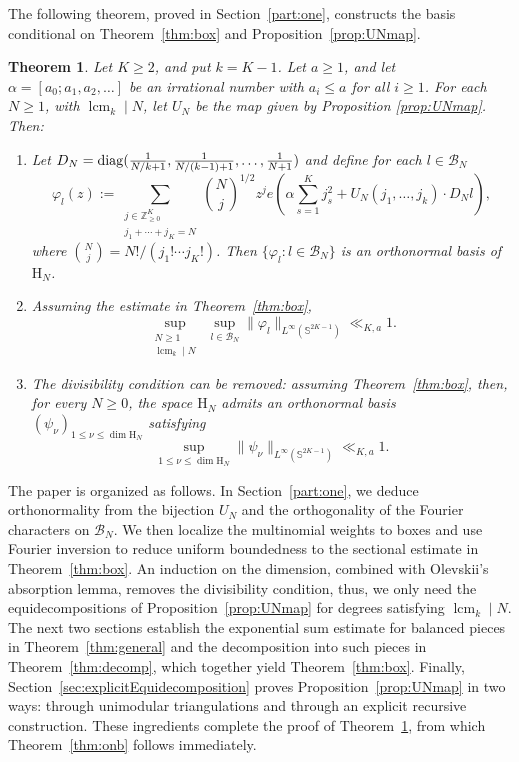 \documentclass[a4paper,reqno,12pt]{amsart}
\theoremstyle{plain}
\newtheorem{theorem}{Theorem}
\theoremstyle{plain}
\theoremstyle{remark}
\theoremstyle{plain}
\newcommand{\B}{\mathscr{B}}
\newcommand{\PolySpace}{\mathrm{H}}
\newcommand{\p}{\varphi}
\newcommand{\Sphere}{\mathbb{S}}
\newcommand{\lcmk}{\operatorname{lcm}_k}
\theoremstyle{plain}
\theoremstyle{plain}
\begin{document}
{The following theorem, proved in Section~\ref{part:one}, constructs the basis conditional on
Theorem~\ref{thm:box} and Proposition~\ref{prop:UNmap}.

\begin{theorem}\label{thm:onbexplicit}
Let $K\ge2${, and} put $k=K-1$. Let $a\ge1$, and let $\alpha = [a_0; a_1, a_2, \ldots]$ be an
irrational number with $a_i \leq a$ for all $i \geq 1$. 
For each $N\ge1$, with $\lcmk\mid N$, let $U_N$ be the map given by Proposition \ref{prop:UNmap}.
Then:
\begin{enumerate}
\item Let $D_N = {\rm diag}(\frac{1}{N/k+1}, \frac{1}{N/(k-1)+1},\ldots, \frac{1}{N+1})$ and define for each $l \in \B_N$
  \begin{equation}
  \p_{l}(z):=
  \sum_{\substack{j\in\mathbb Z_{\ge0}^K\\j_1+\cdots+j_K=N}}
  \binom Nj^{1/2}z^j
  e\left(\alpha\sum_{s=1}^Kj_s^2
  +U_N(j_1,\ldots,j_k)\cdot D_N l\right),
  \label{eq:originalBasis}
  \end{equation}
 where
  $\binom Nj=N!/(j_1!\cdots j_K!)$.
  Then $\{\p_{l}:l\in\B_N\}$ is an orthonormal basis
  of $\PolySpace_N${.}
\item Assuming the estimate in Theorem~\ref{thm:box},
  \[
  \sup_{\substack{N\ge1\\ \lcmk\mid N}}
  \ \sup_{l\in\B_N}
  \|\p_{l}\|_{L^\infty(\Sphere^{2K-1})}\ll_{K,a}1{.}
  \]
\item The divisibility condition can be
  removed: assuming Theorem~\ref{thm:box}, then, for every $N\ge0$, the space $\PolySpace_N$ admits an orthonormal basis
  $(\psi_\nu)_{1\leq \nu\le\dim\PolySpace_N}$ satisfying
  \[
    \sup_{1\leq \nu\le\dim\PolySpace_N}
    \|\psi_\nu\|_{L^\infty(\Sphere^{2K-1})}\ll_{K,a}1.
  \]
\end{enumerate}
\end{theorem} 

{The paper is organized as follows. In Section~\ref{part:one}, we deduce orthonormality from the bijection $U_N$ and the orthogonality of the Fourier characters on $\B_N$. We then localize the multinomial weights to boxes and use Fourier inversion to reduce uniform boundedness to the sectional estimate in Theorem~\ref{thm:box}. An induction on the dimension, combined with Olevskii's absorption lemma, removes the divisibility condition, thus, we only need the equidecompositions of Proposition~\ref{prop:UNmap} for degrees satisfying $\lcmk\mid N$. The next two sections establish the exponential sum estimate for balanced pieces in Theorem~\ref{thm:general} and the decomposition into such pieces in Theorem~\ref{thm:decomp}, which together yield Theorem~\ref{thm:box}. Finally, Section~\ref{sec:explicitEquidecomposition} proves Proposition~\ref{prop:UNmap} in two ways: through unimodular triangulations and through an explicit recursive construction. These ingredients complete the proof of Theorem~\ref{thm:onbexplicit}, from which Theorem~\ref{thm:onb} follows immediately.}

}
\end{document}
